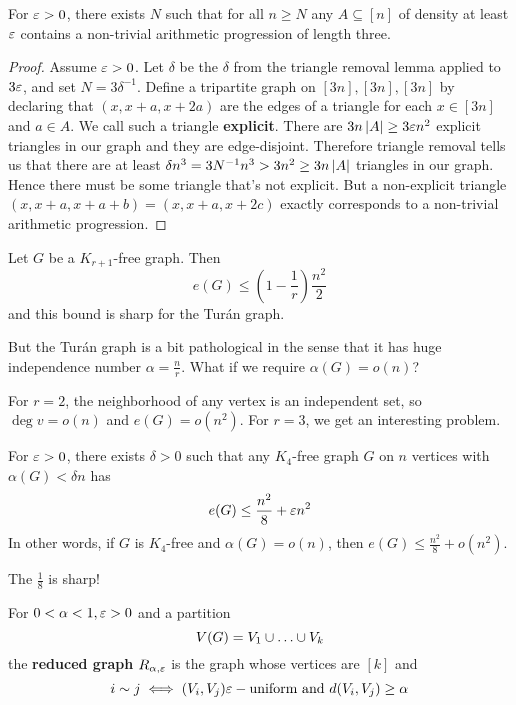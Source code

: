 \documentclass{article}
\begin{document}
\begin{thm}
  For $\varepsilon > 0$, there exists $N$ such that for all $n \ge N$ any $A \subseteq [n]$ of density at least $\varepsilon$ contains a non-trivial arithmetic progression of length three.
\end{thm}
\begin{proof}
  Assume $\varepsilon > 0$. Let $\delta$ be the $\delta$ from the triangle removal lemma applied to $3\varepsilon$, and set $N = 3\delta^{-1}$. Define a tripartite graph on $[3n], [3n], [3n]$ by declaring that $(x, x + a, x + 2a)$ are the edges of a triangle for each $x \in [3n]$ and $a \in A$. We call such a triangle {\bf explicit}. There are $3n\left\lvert A\right\rvert \ge 3\varepsilon n^2$ explicit triangles in our graph and they are edge-disjoint. Therefore triangle removal tells us that there are at least $\delta n^3 = 3N^{-1}n^3 > 3n^2 \ge 3n\left\lvert A\right\rvert$ triangles in our graph. Hence there must be some triangle that's not explicit. But a non-explicit triangle $(x, x + a, x + a + b) = (x, x + a, x + 2c)$ exactly corresponds to a non-trivial arithmetic progression.
\end{proof}

\begin{thm}[Tur\' an]
  Let $G$ be a $K_{r + 1}$-free graph. Then
  $$e(G) \le \left(1 - \frac 1r\right)\frac{n^2}2$$
  and this bound is sharp for the Tur\' an graph.
\end{thm}

But the Tur\' an graph is a bit pathological in the sense that it has huge independence number $\alpha = \frac nr$. What if we require $\alpha(G) = o(n)$?

For $r = 2$, the neighborhood of any vertex is an independent set, so $\deg v = o(n)$ and $e(G) = o(n^2)$. For $r = 3$, we get an interesting problem.

\begin{thm}[Szemerédi]\label{thm:k4-free-small-indep}
  For $\varepsilon > 0$, there exists $\delta > 0$ such that any $K_4$-free graph $G$ on $n$ vertices with $\alpha(G) < \delta n$ has
  $$e(G) \le \frac{n^2}8 + \varepsilon n^2$$
  In other words, if $G$ is $K_4$-free and $\alpha(G) = o(n)$, then $e(G) \le \frac{n^2}8 + o(n^2)$.
\end{thm}
\begin{rmks}
  The $\frac 18$ is sharp!
\end{rmks}

\begin{dfn}
  For $0 < \alpha < 1, \varepsilon > 0$ and a partition
  $$V(G) = V_1 \union \dots \union V_k$$
  the {\bf reduced graph} $R_{\alpha, \varepsilon}$ is the graph whose vertices are $[k]$ and
  $$i \sim j \iff (V_i, V_j) \varepsilon-\text{uniform and } d(V_i, V_j) \ge \alpha$$
\end{dfn}
\end{document}
